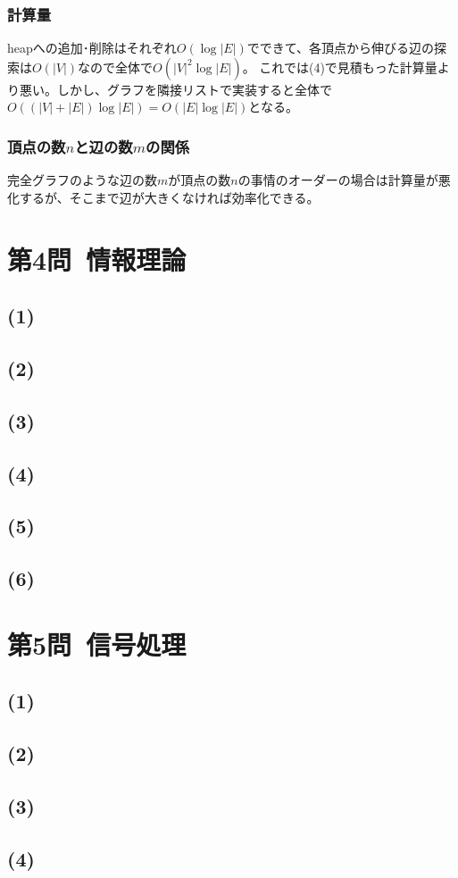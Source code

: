 \documentclass[a4paper,12pt,xelatex,ja=standard]{bxjsarticle}
\begin{document}
\subsubsection*{計算量}
heapへの追加･削除はそれぞれ$O(\log |E|)$でできて、各頂点から伸びる辺の探索は$O(|V|)$なので全体で$O(|V|^2 \log |E|)$。
これでは(4)で見積もった計算量より悪い。しかし、グラフを隣接リストで実装すると全体で$O((|V| + |E|) \log |E|) = O(|E| \log |E|)$となる。

\subsubsection*{頂点の数$n$と辺の数$m$の関係}
完全グラフのような辺の数$m$が頂点の数$n$の事情のオーダーの場合は計算量が悪化するが、そこまで辺が大きくなければ効率化できる。

\section*{第4問\ 情報理論}
\subsection*{(1)}

\subsection*{(2)}

\subsection*{(3)}

\subsection*{(4)}

\subsection*{(5)}

\subsection*{(6)}

\section*{第5問\ 信号処理}
\subsection*{(1)}

\subsection*{(2)}

\subsection*{(3)}

\subsection*{(4)}
\end{document}

